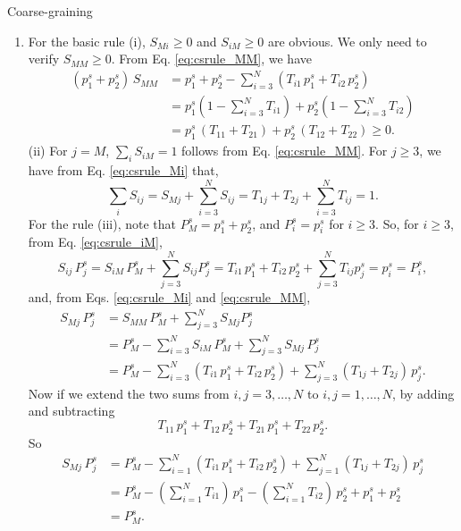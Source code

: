 \documentclass[12pt]{article}
\begin{document}
\begin{problem}{Coarse-graining}
\begin{enumerate}
  \item
    For the basic rule (i),
    $S_{Mi} \ge 0$ and $S_{iM} \ge 0$ are obvious.
    We only need to verify $S_{MM} \ge 0$.
    From Eq. \eqref{eq:csrule_MM}, we have
    $$
    \begin{aligned}
    (p^s_1 + p^s_2) \, S_{MM}
    &=
    p^s_1 + p^s_2 - \sum_{i = 3}^N \left( T_{i1} \, p^s_1 + T_{i2} \, p^s_2 \right)
    \\
    &=
    p^s_1 \left( 1 - \sum_{i = 3}^N T_{i1} \right)
    +
    p^s_2 \left( 1 - \sum_{i = 3}^N T_{i2} \right)
    \\
    &=
    p^s_1 \, \left( T_{11} + T_{21} \right)
    +
    p^s_2 \, \left( T_{12} + T_{22} \right)
    \ge 0.
    \end{aligned}
    $$
    (ii) For $j = M$, $\sum_i S_{iM} = 1$ follows from Eq. \eqref{eq:csrule_MM}.
    For $j \ge 3$, we have from Eq. \eqref{eq:csrule_Mi} that,
    $$
    \sum_i S_{ij} = S_{Mj} + \sum_{i = 3}^N S_{ij}
    = T_{1j} + T_{2j} + \sum_{i = 3}^N T_{ij} = 1.
    $$
    For the rule (iii),
    note that $P^s_M = p^s_1 + p^s_2$, and $P^s_i = p^s_i$ for $i \ge 3$.
    So, for $i \ge 3$, from Eq. \eqref{eq:csrule_iM},
    $$
    S_{ij} \, P^s_j
    = S_{iM} \, P^s_M + \sum_{j = 3}^N S_{ij} P^s_j
    = T_{i1} \, p^s_1 + T_{i2} \, p^s_2 + \sum_{j = 3}^N T_{ij} p^s_j
    = p^s_i = P^s_i,
    $$
    and, from Eqs. \eqref{eq:csrule_Mi} and \eqref{eq:csrule_MM},
    $$
    \begin{aligned}
    S_{Mj} \, P^s_j
    &= S_{MM} \, P^s_M + \sum_{j = 3}^N S_{Mj} P^s_j
    \\
    &= P^s_M - \sum_{i = 3}^N S_{iM} \, P^s_M
    + \sum_{j = 3}^N S_{Mj} \, P^s_j
    \\
    &= P^s_M - \sum_{i = 3}^N (T_{i1} \, p^s_1 + T_{i2} \, p^s_2)
    + \sum_{j = 3}^N (T_{1j} + T_{2j}) \, p^s_j
    .
    \end{aligned}
    $$
    Now if we extend the two sums from $i,j = 3, \dots, N$
    to $i, j = 1, \dots, N$, by adding and subtracting
    $$
    T_{11} \, p^s_1 + T_{12} \, p^s_2 + T_{21} \, p^s_1 + T_{22} \, p^s_2
    .
    $$
    So
    $$
    \begin{aligned}
    S_{Mj} \, P^s_j
    &= P^s_M - \sum_{i = 1}^N (T_{i1} \, p^s_1 + T_{i2} \, p^s_2)
    + \sum_{j = 1}^N (T_{1j} + T_{2j}) \, p^s_j
    \\
    &= P^s_M
    - \left( \sum_{i = 1}^N T_{i1} \right) \, p^s_1
    - \left( \sum_{i = 1}^N T_{i2} \right) \, p^s_2
    + p^s_1 + p^s_2
    \\
    &= P^s_M
    .
    \end{aligned}
    $$


\end{enumerate}
\end{problem}
\end{document}

